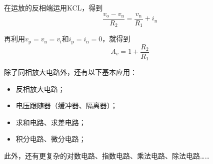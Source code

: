在运放的反相端运用KCL，得到
\begin{equation}
    \frac{v_\mathrm{o}-v_\mathrm{n}}{R_2}=\frac{v_\mathrm{n}}{R_1}+i_\mathrm{n}
\end{equation}

再利用$v_{\mathrm{p}}=v_{\mathrm{n}}=v_{\mathrm{i}}$和$i_{\mathrm{p}}=i_{\mathrm{n}}=0$，就得到
\begin{equation}
    A_v=1+\frac{R_2}{R_1}
\end{equation}

除了同相放大电路外，还有以下基本应用：
\begin{itemize}
    \item 反相放大电路；
    \item 电压跟随器（缓冲器、隔离器）；
    \item 求和电路、求差电路；
    \item 积分电路、微分电路；
\end{itemize}

此外，还有更复杂的对数电路、指数电路、乘法电路、除法电路……